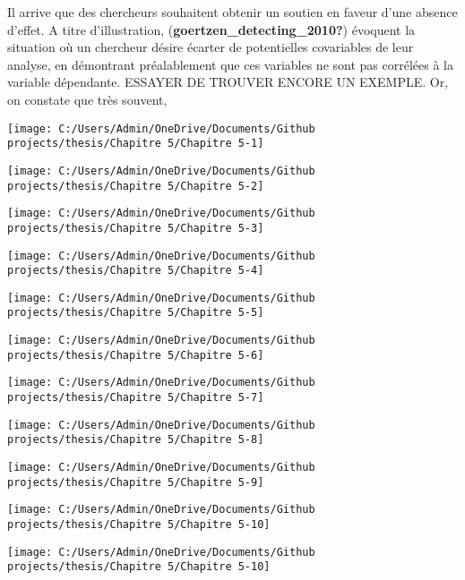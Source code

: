 \documentclass[
  english,
  man]{apa6}
\begin{document}
Il arrive que des chercheurs souhaitent obtenir un soutien en faveur d'une absence d'effet. A titre d'illustration, (\textbf{goertzen\_detecting\_2010?}) évoquent la situation où un chercheur désire écarter de potentielles covariables de leur analyse, en démontrant préalablement que ces variables ne sont pas corrélées à la variable dépendante. ESSAYER DE TROUVER ENCORE UN EXEMPLE. Or, on constate que très souvent,

\begin{center}\texttt{[image: C:/Users/Admin/OneDrive/Documents/Github projects/thesis/Chapitre 5/Chapitre 5-1]} \end{center}

\begin{center}\texttt{[image: C:/Users/Admin/OneDrive/Documents/Github projects/thesis/Chapitre 5/Chapitre 5-2]} \end{center}

\begin{center}\texttt{[image: C:/Users/Admin/OneDrive/Documents/Github projects/thesis/Chapitre 5/Chapitre 5-3]} \end{center}

\begin{center}\texttt{[image: C:/Users/Admin/OneDrive/Documents/Github projects/thesis/Chapitre 5/Chapitre 5-4]} \end{center}

\begin{center}\texttt{[image: C:/Users/Admin/OneDrive/Documents/Github projects/thesis/Chapitre 5/Chapitre 5-5]} \end{center}

\begin{center}\texttt{[image: C:/Users/Admin/OneDrive/Documents/Github projects/thesis/Chapitre 5/Chapitre 5-6]} \end{center}

\begin{center}\texttt{[image: C:/Users/Admin/OneDrive/Documents/Github projects/thesis/Chapitre 5/Chapitre 5-7]} \end{center}

\begin{center}\texttt{[image: C:/Users/Admin/OneDrive/Documents/Github projects/thesis/Chapitre 5/Chapitre 5-8]} \end{center}

\begin{center}\texttt{[image: C:/Users/Admin/OneDrive/Documents/Github projects/thesis/Chapitre 5/Chapitre 5-9]} \end{center}

\begin{center}\texttt{[image: C:/Users/Admin/OneDrive/Documents/Github projects/thesis/Chapitre 5/Chapitre 5-10]} \end{center}

\begin{center}\texttt{[image: C:/Users/Admin/OneDrive/Documents/Github projects/thesis/Chapitre 5/Chapitre 5-10]} \end{center}
\end{document}
